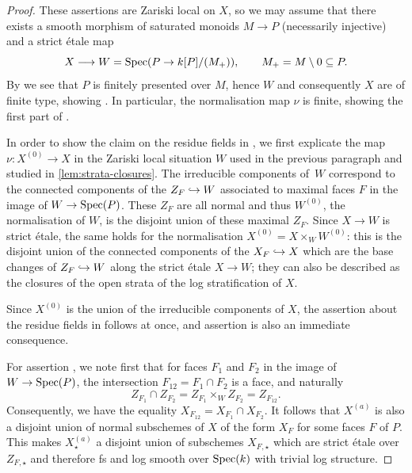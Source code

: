 \begin{proof}
These assertions are Zariski local on $X$, so we may assume that there exists a smooth morphism of saturated monoids $M\to P$ (necessarily injective) and a strict \'etale map  
\[ 
    X \longrightarrow W = \operatorname{Spec}(P\to k[P]/(M_+)), \qquad M_+ = M\setminus 0 \subseteq P.
\]
By \cite[Corollary~2.5.18]{AHLS-Log} we see that $P$ is finitely presented over $M$, hence $W$ and consequently $X$ are of finite type, showing . In particular, the normalisation map $\nu$ is finite, showing the first part of  .

In order to show the claim on the residue fields in , we first explicate the map $\nu\colon X^{(0)}\to X$ in the Zariski local situation $W$ used in the previous paragraph and studied in \cref{lem:strata-closures}. 
The irreducible components of~$W$ correspond to the connected components of the $Z_F \hookrightarrow W$ associated to maximal faces $F$ in the image of $W \to \operatorname{Spec}(P)$. These $Z_F$ are all normal and thus $W^{(0)}$, the normalisation of $W$, is the disjoint union of these maximal $Z_F$. Since $X \to W$ is strict \'etale, the same holds for the normalisation $X^{(0)} = X \times_W W^{(0)}$: this is the disjoint union of the connected components of the $X_F \hookrightarrow X$ which are the base changes of $Z_F \hookrightarrow W$ along the strict \'etale $X \to W$; they can also be described as the closures of the open strata of the log stratification of $X$.

Since $X^{(0)}$ is the union of the irreducible components of $X$, the assertion about the residue fields in  follows at once, and assertion  is also an immediate consequence. 

For assertion , we note first that for faces $F_1$ and $F_2$ in the image of $W \to \operatorname{Spec}(P)$, the intersection $F_{12} = F_1 \cap F_2$ is a face, and naturally 
\[
Z_{F_1} \cap Z_{F_2} = Z_{F_1} \times_W Z_{F_2} = Z_{F_{12}}.
\]
Consequently, we have the equality $X_{F_{12}} = X_{F_1} \cap X_{F_2}$. It follows that $X^{(a)}$ is also a disjoint union of normal subschemes of $X$ of the form $X_F$ for some faces $F$ of $P$. This makes $X^{(a)}_\star$ a disjoint union of subschemes $X_{F,\star}$ which are strict \'etale over $Z_{F,\star}$ and therefore fs and log smooth over $\operatorname{Spec}(k)$ with trivial log structure. 
 

\end{proof}
